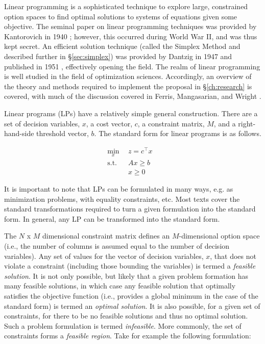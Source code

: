 Linear programming is a sophisticated technique to explore large, constrained
option spaces to find optimal solutions to systems of equations given some
objective. The seminal paper on linear programming techniques was provided by
Kantorovich in 1940 \cite{kantorovich_new_1940}; however, this occurred during
World War II, and was thus kept secret. An efficient solution technique (called
the Simplex Method and described further in \S\ref{sec:simplex}) was provided by
Dantzig in 1947 and published in 1951 \cite{dantzig_maximization_1951},
effectively opening the field. The realm of linear programming is well studied
in the field of optimization sciences. Accordingly, an overview of the theory
and methods required to implement the proposal in \S \ref{ch:research} is
covered, with much of the discussion covered in Ferris, Mangasarian, and
Wright \cite{ferris_linear_2008}.

Linear programs (LPs) have a relatively simple general construction. There are a
set of decision variables, $x$, a cost vector, $c$, a constraint matrix, $M$,
and a right-hand-side threshold vector, $b$. The standard form for linear
programs is as follows.

\begin{subequations}\label{eqs:std-form}
  \begin{align}
    \min_{x} \:\: & 
    z = c^{\top} x
    & \label{eqs:std-form_obj} \\
    \text{s.t.} \:\: &
    A x \geq b 
    & \label{eqs:std-form_sup} \\
    &
    x \geq 0
    &\label{eqs:std-form_x}
  \end{align}
\end{subequations}

It is important to note that LPs can be formulated in many ways, e.g. as
minimization problems, with equality constraints, etc. Most texts cover the
standard transformations required to turn a given formulation into the standard
form. In general, any LP can be transformed into the standard form.

The $N$ x $M$ dimensional constraint matrix defines an $M$-dimensional option
space (i.e., the number of columns is assumed equal to the number of decision
variables). Any set of values for the vector of decision variables, $x$, that
does not violate a constraint (including those bounding the variables) is termed
a \textit{feasible solution}. It is not only possible, but likely that a given
problem formation has many feasible solutions, in which case any feasible
solution that optimally satisfies the objective function (i.e., provides a
global minimum in the case of the standard form) is termed an \textit{optimal
solution}. It is also possible, for a given set of constraints, for there to be
no feasible solutions and thus no optimal solution. Such a problem formulation
is termed \textit{infeasible}. More commonly, the set of constraints forms
a \textit{feasible region}. Take for example the following formulation:

